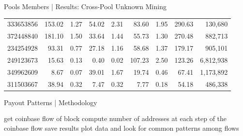 \documentclass[10pt]{beamer}
\begin{document}
\begin{frame}[fragile]{Pools Members | Results: Cross-Pool Unknown Mining}
\begin{table}[]
{\begin{tabular}{@{}rrrrrrrrr@{}}
            333653856  & 153.02                  & 1.27                      & 54.02                   & 2.31                      & 83.60                   & 1.95                      & 290.63               & 130,680   \\
            372448840  & 181.10                  & 1.50                      & 33.64                   & 1.44                      & 55.73                   & 1.30                      & 270.48               & 882,713  \\
            234254928  & 93.31                   & 0.77                      & 27.18                   & 1.16                      & 58.68                   & 1.37                      & 179.17               & 905,101   \\
            249123673  & 15.63                   & 0.13                      & 0.40                    & 0.02                      & 107.23                  & 2.50                      & 123.26               & 6,812,938 \\
            349962609  & 8.67                    & 0.07                      & 39.01                   & 1.67                      & 19.74                   & 0.46                      & 67.41                & 1,173,892 \\
            311503667  & 38.94                   & 0.32                      & 7.47                    & 0.32                      & 7.77                    & 0.18                      & 54.18                & 486,338 \\
            \bottomrule
            \end{tabular}
        }
    \end{table}
\end{frame}

\begin{frame}[fragile]{Payout Patterns | Methodology}
    \begin{algorithm}[H]
        \caption{Find payout patterns in BTC.com, AntPool and ViaBTC.}\label{algo:blocks_addresses}
        \begin{algorithmic}[1]
                    \State get coinbase flow of block
                    \State compute number of addresses at each step of the coinbase flow
                    \State save results
                \EndFor
                \State plot data and look for common patterns among flows
            \EndFor
        \end{algorithmic}
    \end{algorithm}
\end{frame}
\end{document}
